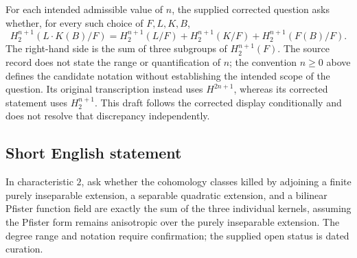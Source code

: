 \documentclass[11pt]{article}
\begin{document}
For each intended admissible value of \(n\), the supplied corrected question asks whether, for every such choice of \(F,L,K,B\),
\[
 H_2^{n+1}\!\left(L\mathbin{\cdot}K(B)/F\right)
 =H_2^{n+1}(L/F)
  +H_2^{n+1}(K/F)
  +H_2^{n+1}(F(B)/F).
\]
The right-hand side is the sum of three subgroups of \(H_2^{n+1}(F)\). The source record does not state the range or quantification of \(n\); the convention \(n\geq0\) above defines the candidate notation without establishing the intended scope of the question. Its original transcription instead uses \(H^{2n+1}\), whereas its corrected statement uses \(H_2^{n+1}\). This draft follows the corrected display conditionally and does not resolve that discrepancy independently.
\subsection{Short English statement}
In characteristic \(2\), ask whether the cohomology classes killed by adjoining a finite purely inseparable extension, a separable quadratic extension, and a bilinear Pfister function field are exactly the sum of the three individual kernels, assuming the Pfister form remains anisotropic over the purely inseparable extension. The degree range and notation require confirmation; the supplied open status is dated curation.
\end{document}
